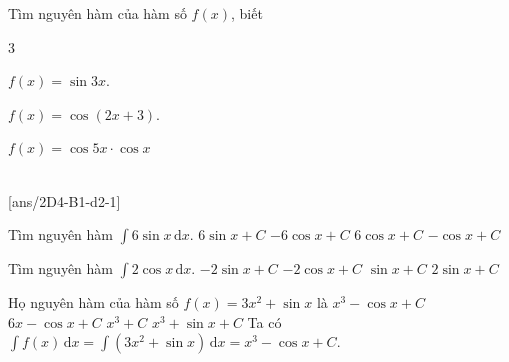 \begin{vd}
	Tìm nguyên hàm của hàm số $f(x)$, biết
	\begin{enumEX}[a)]{3}
		\item $f(x)=\sin 3x$.
		\item $f(x)=\cos (2x+3).$
		\item $f(x)=\cos 5x \cdot\cos x $ 
	\end{enumEX}
\end{vd}
\setcounter{ex}{0}
 \\
\setcounter{ex}{0}
[ans/2D4-B1-d2-1]


\begin{ex}
	Tìm nguyên hàm $  \displaystyle \int {6 \sin x\mathrm{\,d}x}$. 
	\choice
	{ $ 6 \sin x+C$ }
	{ \True $ - 6 \cos x+C$ }
	{ $ 6 \cos x+C$ }
	{ $ - \cos x+C$ }
	\end{ex}
\begin{ex}
	Tìm nguyên hàm $ \displaystyle  \int {2 \cos x\mathrm{\,d}x}$. 
	\choice
	{ $ - 2 \sin x+C$ }
	{ $ - 2 \cos x+C$ }
	{ $ \sin x+C$ }
	{ \True $ 2 \sin x+C$ }
	\end{ex}
\begin{ex}
	Họ nguyên hàm của hàm số $f(x)=3x^2+\sin x$ là
	\choice
	{\True $x^3-\cos x+C$}
	{$6x-\cos x+C$}
	{$x^3+C$}
	{$x^3+\sin x+C$}
	\loigiai
	{
		Ta có $\displaystyle\int f(x)\mathrm{\,d}x=\displaystyle\int \left(3x^2+\sin x\right)\mathrm{\,d}x=x^3-\cos x+C$.
	}
\end{ex}

